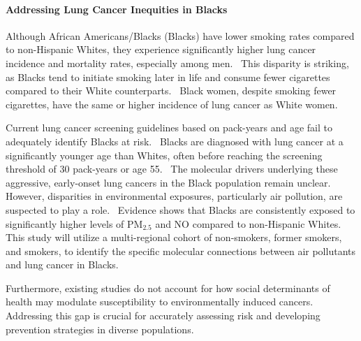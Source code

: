 \paragraph{Addressing Lung Cancer Inequities in Blacks}
Although African Americans/Blacks (Blacks) have lower smoking rates compared to non-Hispanic Whites, 
they experience significantly higher lung cancer incidence and mortality rates, especially among men.~\cite{x} 
This disparity is striking, as Blacks tend to initiate smoking later in life and consume fewer cigarettes compared to their White counterparts.~\cite{x} 
Black women, despite smoking fewer cigarettes, have the same or higher incidence of lung cancer as White women.~\cite{x}

Current lung cancer screening guidelines based on pack-years and age fail to adequately identify Blacks at risk.~\cite{x} 
Blacks are diagnosed with lung cancer at a significantly younger age than Whites, often before reaching the screening threshold of 30 pack-years or age 55.~\cite{x} 
The molecular drivers underlying these aggressive, early-onset lung cancers in the Black population remain unclear.~\cite{x} 
However, disparities in environmental exposures, particularly air pollution, are suspected to play a role.~\cite{x} 
Evidence shows that Blacks are consistently exposed to significantly higher levels of PM$_{2.5}$ and NO compared to non-Hispanic Whites.~\cite{x} 
This study will utilize a multi-regional cohort of non-smokers, former smokers, and smokers,
to identify the specific molecular connections between air pollutants and lung cancer in Blacks.

Furthermore, existing studies do not account for how social determinants of health may modulate susceptibility to environmentally induced cancers.~\cite{x} 
Addressing this gap is crucial for accurately assessing risk and developing prevention strategies in diverse populations.

